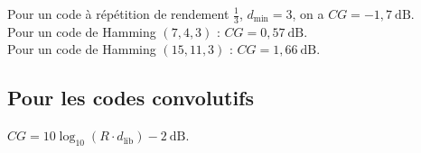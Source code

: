 	Pour un code à répétition de rendement $\frac{1}{3}$, $d_{\min} = 3$, on a $CG = -1{,}7\ \text{dB}$.\\
	Pour un code de Hamming $(7,4,3)$ : $CG = 0{,}57\ \text{dB}$.\\
	Pour un code de Hamming $(15,11,3)$ : $CG = 1{,}66\ \text{dB}$.


\subsection{Pour les codes convolutifs}

	$CG = 10 \log_{10}(R \cdot d_{\text{lib}}) - 2\ \text{dB}$.

